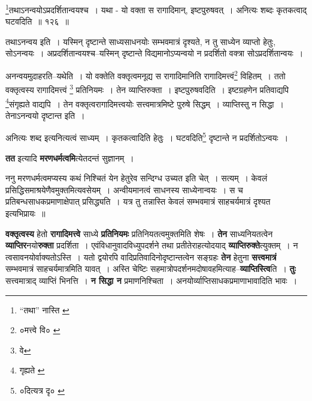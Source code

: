 \documentclass[article,12pt,a4paper]{memoir}
\begin{document}
	  \bigskip
	  \begingroup
	

	  \pstart \footnote{“तथा” नास्ति \cite{dp-msB} \cite{dp-edP} \cite{dp-edH} \cite{dp-edE} \cite{dp-edN}}\-तथाऽनन्वयोऽप्रदर्शितान्वयश्च । यथा - यो वक्ता स रागादिमान्, इष्टपुरुषवत् । अनित्यः शब्दः कृतकत्वाद् घटवदिति ॥ १२६ ॥
	\pend
      
	  \endgroup
	 

	  \pstart तथाऽनन्वय इति । यस्मिन् दृष्टान्ते साध्यसाधनयोः सम्भवमात्रं दृश्यते, न तु साध्येन व्याप्तो हेतुः, सोऽनन्वयः । अप्रदर्शितान्वयश्च--यस्मिन् दृष्टान्ते विद्यमानोऽप्यन्वयो न प्रदर्शितो वक्त्रा सोऽप्रदर्शितान्वयः ।
	\pend
       

	  \pstart अनन्वयमुदाहरति--यथेति । यो वक्तेति वक्तृत्वमनूद्य स रागादिमानिति रागादिमत्त्वं\footnote{०मत्त्वे वि० \cite{dp-msA}} विहितम् । ततो वक्तृत्वस्य रागादिमत्त्वं \footnote{वे} प्रतिनियमः । तेन व्याप्तिरुक्ता । इष्टपुरुषवदिति । इष्टग्रहणेन प्रतिवाद्यपि \footnote{गृह्यते \cite{dp-msA} \cite{dp-edP} \cite{dp-edH} \cite{dp-edE} \cite{dp-edN}}\-संगृह्यते वाद्यपि । तेन वक्तृत्वरागादिमत्त्वयोः सत्त्वमात्रमिष्टे पुरुषे सिद्धम् । व्याप्तिस्तु न सिद्धा । तेनाऽनन्वयो दृष्टान्त इति ।
	\pend
       

	  \pstart अनित्यः शब्द इत्यनित्यत्वं साध्यम् । कृतकत्वादिति हेतुः । घटवदिति\footnote{०दित्यत्र दृ० \cite{dp-msA} \cite{dp-edP} \cite{dp-edH} \cite{dp-edE}} दृष्टान्ते न प्रदर्शितोऽन्वयः ।
	\pend
      
	  \endgroup
	

	  \pstart \textbf{तत} इत्यादि \textbf{मरणधर्मत्वमि}त्येतदन्तं सुज्ञानम् ।
	\pend
      

	  \pstart ननु मरणधर्मत्वमप्यस्य कथं निश्चितं येन हेतुरेव सन्दिग्ध उच्यत इति चेत् । सत्यम् । केवलं प्रसिद्धिसमाश्रयेणैवमुक्तमित्यवसेयम् । अन्वीयमानत्वं साधनस्य साध्येनान्वयः । स च प्रतिबन्धसाधकप्रमाणाक्षेपात् प्रसिद्ध्यति । यत्र तु तन्नास्ति केवलं सम्भवमात्रं साहचर्यमात्रं दृश्यत इत्यभिप्रायः ॥
	\pend
      

	  \pstart \textbf{वक्तृत्वस्य} हेतो \textbf{रागादिमत्त्वे} \leavevmode{} साध्ये \textbf{प्रतिनियमः} प्रतिनियतत्वमुक्तमिति शेषः । \textbf{तेन} साध्यनियतत्वेन \textbf{व्याप्तिर}नयो\textbf{रुक्ता} प्रदर्शिता । एवंविधानुवादविध्युपदर्शने तथा प्रतीतेराहत्योदयाद् \textbf{व्याप्तिरुक्ते}त्युक्तम् । न त्वसावनयोर्वाक्यतोऽस्ति । यतो द्वयोरपि वादिप्रतिवादिनोदृष्टान्तत्वेन सङ्ग्रहः \textbf{तेन} हेतुना \textbf{सत्त्वमात्रं} सम्भवमात्रं साहचर्यमात्रमिति यावत् । अस्ति चेष्टिः सहमात्रोपदर्शनमदोषावहमित्याह--\textbf{व्याप्तिस्त्वि}ति । \textbf{तुः} सत्त्वमात्राद् व्याप्तिं भिनत्ति । \textbf{न सिद्धा न} प्रमाणनिश्चिता । अनयोर्व्याप्तिसाधकप्रमाणाभावादिति भावः ।
	\pend
      
\end{document}
